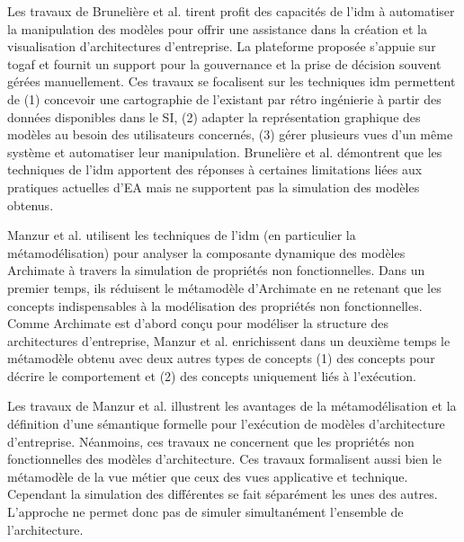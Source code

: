 Les travaux de Brunelière et al. \cite{bruneliere2013mde} tirent profit des capacités de l'\gls{idm} à automatiser la manipulation des modèles pour offrir une assistance dans la création et la visualisation d'architectures d'entreprise. La plateforme proposée s'appuie sur \gls{togaf} et fournit un support pour la gouvernance et la prise de décision souvent gérées manuellement. Ces travaux se focalisent sur les techniques \gls{idm} permettent de (1) concevoir une cartographie de l'existant par rétro ingénierie à partir des données disponibles dans le SI, (2) adapter la représentation graphique des modèles au besoin des utilisateurs concernés, (3) gérer plusieurs vues d'un même système et automatiser leur manipulation. Brunelière et al. \cite{bruneliere2013mde} démontrent que les techniques de l'\gls{idm} apportent des réponses à certaines limitations liées aux pratiques actuelles d'EA mais ne supportent pas la simulation des modèles obtenus. 

Manzur et al.\cite{manzur2015xarchimate} utilisent les techniques de l'\gls{idm} (en particulier la métamodélisation) pour analyser la composante dynamique des modèles Archimate à travers la simulation de propriétés non fonctionnelles. Dans un premier temps, ils réduisent le métamodèle  d'Archimate en ne retenant que les concepts indispensables à la modélisation des propriétés non fonctionnelles. Comme Archimate est d'abord conçu pour modéliser la structure des architectures d'entreprise, Manzur et al. \cite{manzur2015xarchimate} enrichissent dans un deuxième temps le métamodèle obtenu avec deux autres types de concepts (1) des concepts pour décrire le comportement et (2) des concepts uniquement liés à l'exécution. 

Les travaux de Manzur et al. \cite{manzur2015xarchimate} illustrent les avantages de la métamodélisation et la définition d'une sémantique formelle pour l'exécution de modèles d'architecture d'entreprise. Néanmoins, ces travaux ne concernent que les propriétés non fonctionnelles des modèles d'architecture. Ces travaux formalisent aussi bien le métamodèle de la vue métier  que ceux des vues applicative et technique. Cependant la simulation des différentes se fait séparément les unes des autres. L'approche ne permet donc pas de simuler simultanément l'ensemble de l'architecture. 


%
%
%
%
%
%
%



